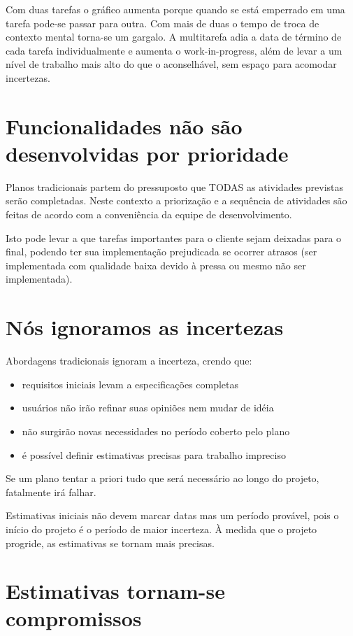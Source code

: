 \documentclass[a4paper,abntfigtabnum,noindentfirst]{abnt}
\begin{document}
Com duas tarefas o gráfico aumenta porque quando se está emperrado em uma tarefa pode-se passar para outra. Com mais de duas o tempo de troca de contexto mental torna-se um gargalo. A multitarefa adia a data de término de cada tarefa individualmente e aumenta o work-in-progress, além de levar a um nível de trabalho mais alto do que o aconselhável, sem espaço para acomodar incertezas.


\section{Funcionalidades não são desenvolvidas por prioridade}

Planos tradicionais partem do pressuposto que TODAS as atividades previstas serão completadas. Neste contexto a priorização e a sequência de atividades são feitas de acordo com a conveniência da equipe de desenvolvimento.

Isto pode levar a que tarefas importantes para o cliente sejam deixadas para o final, podendo ter sua implementação prejudicada se ocorrer atrasos (ser implementada com qualidade baixa devido à pressa ou mesmo não ser implementada).


\section{Nós ignoramos as incertezas}

Abordagens tradicionais ignoram a incerteza, crendo que:
\begin{itemize}
\item requisitos iniciais levam a especificações completas
\item usuários não irão refinar suas opiniões nem mudar de idéia
\item não surgirão novas necessidades no período coberto pelo plano
\item é possível definir estimativas precisas para trabalho impreciso
\end{itemize}

Se um plano tentar a priori tudo que será necessário ao longo do projeto, fatalmente irá falhar.

Estimativas iniciais não devem marcar datas mas um período provável, pois o início do projeto é o período de maior incerteza. À medida que o projeto progride, as estimativas se tornam mais precisas.


\section{Estimativas tornam-se compromissos}
\end{document}
